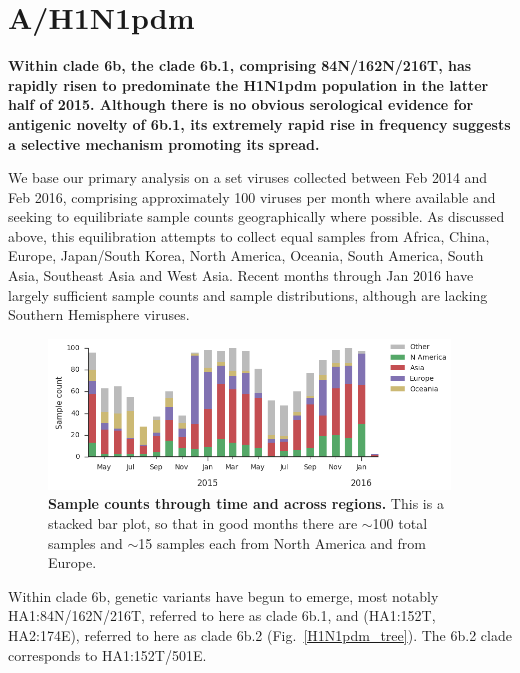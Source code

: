 \documentclass[11pt,oneside,letterpaper]{article}
\begin{document}
\clearpage
\pagebreak

\section*{A/H1N1pdm}

\textbf{Within clade 6b, the clade 6b.1, comprising 84N/162N/216T, has rapidly risen to predominate the H1N1pdm population in the latter half of 2015. Although there is no obvious serological evidence for antigenic novelty of 6b.1, its extremely rapid rise in frequency suggests a selective mechanism promoting its spread.}

We base our primary analysis on a set viruses collected between Feb 2014 and Feb 2016, comprising approximately 100 viruses per month where available and seeking to equilibriate sample counts geographically where possible. As discussed above, this equilibration attempts to collect equal samples from Africa, China, Europe, Japan/South Korea, North America, Oceania, South America, South Asia, Southeast Asia and West Asia. Recent months through Jan 2016 have largely sufficient sample counts and sample distributions, although are lacking Southern Hemisphere viruses.

\begin{figure}[H]
	\centering		
	\includegraphics[width=0.95\textwidth]{../figures/feb-2016/H1N1pdm_counts.png}
	\caption{\textbf{Sample counts through time and across regions.}
	This is a stacked bar plot, so that in good months there are $\sim$100 total samples and $\sim$15 samples each from North America and from Europe.	
	}
	\label{H1N1pdm_counts}
\end{figure}

\pagebreak

Within clade 6b, genetic variants have begun to emerge, most notably HA1:84N/162N/216T, referred to here as clade 6b.1, and (HA1:152T, HA2:174E), referred to here as clade 6b.2 (Fig.\ \ref{H1N1pdm_tree}). The 6b.2 clade corresponds to HA1:152T/501E.
\end{document}
